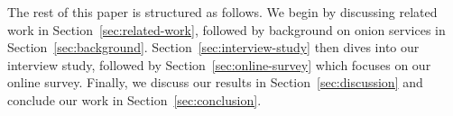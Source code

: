 The rest of this paper is structured as follows.  We begin by discussing related
work in Section~\ref{sec:related-work}, followed by background on onion services
in Section~\ref{sec:background}.  Section~\ref{sec:interview-study} then dives
into our interview study, followed by Section~\ref{sec:online-survey} which
focuses on our online survey.  Finally, we discuss our results in
Section~\ref{sec:discussion} and conclude our work in
Section~\ref{sec:conclusion}.
